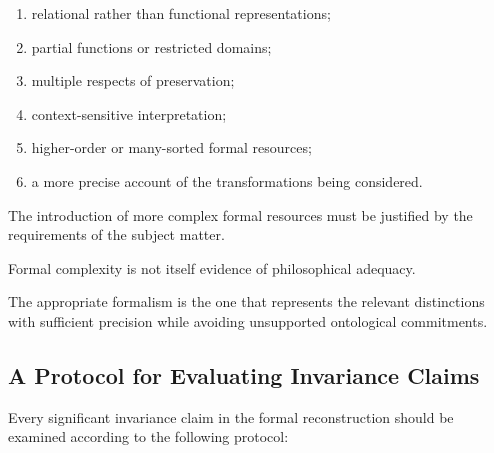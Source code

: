 \begin{enumerate}
    \item relational rather than functional
    representations;

    \item partial functions or restricted domains;

    \item multiple respects of preservation;

    \item context-sensitive interpretation;

    \item higher-order or many-sorted formal
    resources;

    \item a more precise account of the
    transformations being considered.
\end{enumerate}

The introduction of more complex formal
resources must be justified by the requirements
of the subject matter.

Formal complexity is not itself evidence
of philosophical adequacy.

The appropriate formalism is the one that
represents the relevant distinctions with
sufficient precision while avoiding unsupported
ontological commitments.

\subsection{A Protocol for Evaluating Invariance Claims}

Every significant invariance claim in the
formal reconstruction should be examined
according to the following protocol:

